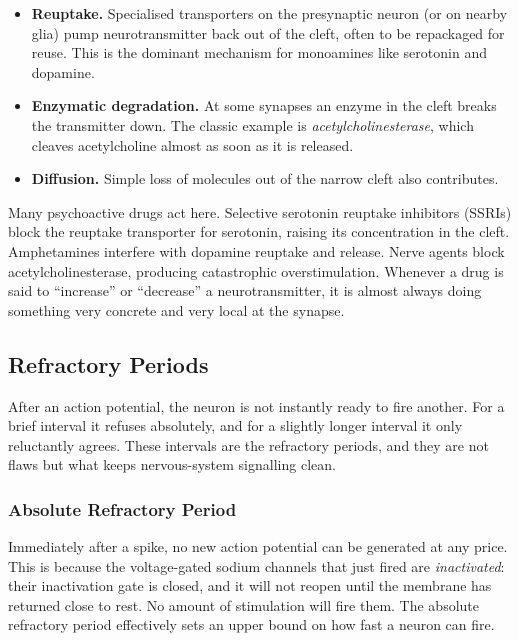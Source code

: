 \documentclass[11pt]{article}
\begin{document}
\begin{itemize}
    \item \textbf{Reuptake.} Specialised transporters on the presynaptic neuron (or on nearby glia) pump neurotransmitter back out of the cleft, often to be repackaged for reuse. This is the dominant mechanism for monoamines like serotonin and dopamine.
    \item \textbf{Enzymatic degradation.} At some synapses an enzyme in the cleft breaks the transmitter down. The classic example is \textit{acetylcholinesterase}, which cleaves acetylcholine almost as soon as it is released.
    \item \textbf{Diffusion.} Simple loss of molecules out of the narrow cleft also contributes.
\end{itemize}

Many psychoactive drugs act here. Selective serotonin reuptake inhibitors (SSRIs) block the reuptake transporter for serotonin, raising its concentration in the cleft. Amphetamines interfere with dopamine reuptake and release. Nerve agents block acetylcholinesterase, producing catastrophic overstimulation. Whenever a drug is said to ``increase'' or ``decrease'' a neurotransmitter, it is almost always doing something very concrete and very local at the synapse.

\subsection{Refractory Periods}

After an action potential, the neuron is not instantly ready to fire another. For a brief interval it refuses absolutely, and for a slightly longer interval it only reluctantly agrees. These intervals are the refractory periods, and they are not flaws but what keeps nervous-system signalling clean.

\subsubsection{Absolute Refractory Period}

Immediately after a spike, no new action potential can be generated at any price. This is because the voltage-gated sodium channels that just fired are \textit{inactivated}: their inactivation gate is closed, and it will not reopen until the membrane has returned close to rest. No amount of stimulation will fire them. The absolute refractory period effectively sets an upper bound on how fast a neuron can fire.
\end{document}
